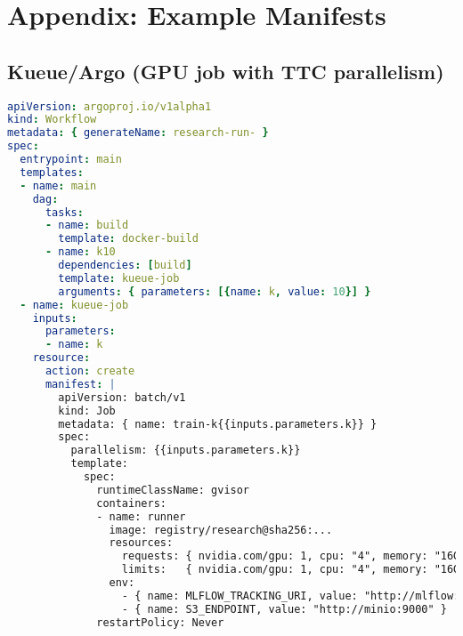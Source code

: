 \section{Appendix: Example Manifests}
\subsection*{Kueue/Argo (GPU job with TTC parallelism)}
\begin{lstlisting}[style=code,language=yaml]
apiVersion: argoproj.io/v1alpha1
kind: Workflow
metadata: { generateName: research-run- }
spec:
  entrypoint: main
  templates:
  - name: main
    dag:
      tasks:
      - name: build
        template: docker-build
      - name: k10
        dependencies: [build]
        template: kueue-job
        arguments: { parameters: [{name: k, value: 10}] }
  - name: kueue-job
    inputs:
      parameters:
      - name: k
    resource:
      action: create
      manifest: |
        apiVersion: batch/v1
        kind: Job
        metadata: { name: train-k{{inputs.parameters.k}} }
        spec:
          parallelism: {{inputs.parameters.k}}
          template:
            spec:
              runtimeClassName: gvisor
              containers:
              - name: runner
                image: registry/research@sha256:...
                resources:
                  requests: { nvidia.com/gpu: 1, cpu: "4", memory: "16Gi" }
                  limits:   { nvidia.com/gpu: 1, cpu: "4", memory: "16Gi" }
                env:
                  - { name: MLFLOW_TRACKING_URI, value: "http://mlflow:5000" }
                  - { name: S3_ENDPOINT, value: "http://minio:9000" }
              restartPolicy: Never
\end{lstlisting}




